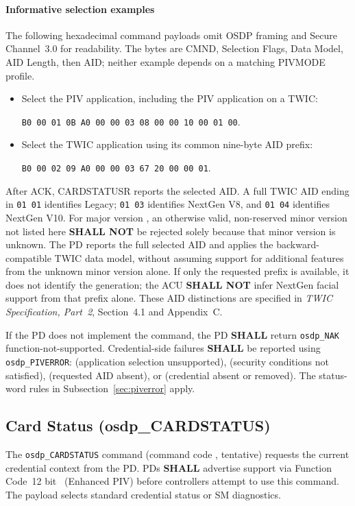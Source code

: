 \paragraph{Informative selection examples}
The following hexadecimal command payloads omit OSDP framing and Secure Channel~3.0
for readability. The bytes are CMND, Selection Flags, Data Model, AID Length,
then AID; neither example depends on a matching PIVMODE profile.
\begin{itemize}
  \item Select the PIV application, including the PIV application on a TWIC:\par
    \texttt{B0 00 01 0B A0 00 00 03 08 00 00 10 00 01 00}.
  \item Select the TWIC application using its common nine-byte AID prefix:\par
    \texttt{B0 00 02 09 A0 00 00 03 67 20 00 00 01}.
\end{itemize}
After ACK, CARDSTATUSR reports the selected AID. A full TWIC AID ending in
\texttt{01 01} identifies Legacy; \texttt{01 03} identifies NextGen V8, and
\texttt{01 04} identifies NextGen V10. For major version , an otherwise
valid, non-reserved minor version not listed here \textbf{SHALL NOT} be rejected
solely because that minor version is unknown. The PD reports the full selected AID
and applies the backward-compatible TWIC data model, without assuming support for
additional features from the unknown minor version alone.
If only the requested prefix is available, it does not identify the generation;
the ACU \textbf{SHALL NOT} infer NextGen facial support from that prefix alone.
These AID distinctions are specified in \emph{TWIC Specification, Part~2},
Section~4.1 and Appendix~C.

If the PD does not implement the command, the PD \textbf{SHALL} return
\texttt{osdp\_NAK} function-not-supported. Credential-side failures
\textbf{SHALL} be reported using \texttt{osdp\_PIVERROR}: 
(application selection unsupported),  (security conditions not
satisfied),  (requested AID absent), or  (credential
absent or removed). The status-word rules in Subsection~\ref{sec:piverror} apply.

\subsection{Card Status (osdp\_CARDSTATUS)}

The \texttt{osdp\_CARDSTATUS} command (command code , tentative) requests the current credential context from the PD. PDs \textbf{SHALL} advertise support via Function Code~12 bit~ (Enhanced PIV) before controllers attempt to use this command. The payload selects standard credential status or SM diagnostics.

